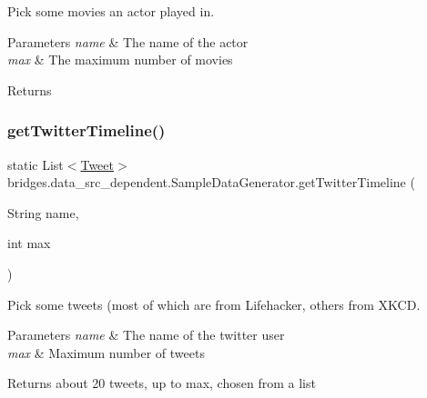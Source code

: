 Pick some movies an actor played in. 
\begin{DoxyParams}{Parameters}
{\em name} & The name of the actor \\
\hline
{\em max} & The maximum number of movies \\
\hline
\end{DoxyParams}
\begin{DoxyReturn}{Returns}

\end{DoxyReturn}
\mbox{\label{classbridges_1_1data__src__dependent_1_1_sample_data_generator_a9e52e53de820233e76553f5db1a01c80}} 
\subsubsection{\texorpdfstring{get\+Twitter\+Timeline()}{getTwitterTimeline()}}
{\footnotesize\ttfamily static List$<$\mbox{\hyperlink{classbridges_1_1data__src__dependent_1_1_tweet}{Tweet}}$>$ bridges.\+data\+\_\+src\+\_\+dependent.\+Sample\+Data\+Generator.\+get\+Twitter\+Timeline (\begin{DoxyParamCaption}\item[{String}]{name,  }\item[{int}]{max }\end{DoxyParamCaption})\hspace{0.3cm}{\ttfamily [static]}}

Pick some tweets (most of which are from Lifehacker, others from X\+K\+CD. 
\begin{DoxyParams}{Parameters}
{\em name} & The name of the twitter user \\
\hline
{\em max} & Maximum number of tweets \\
\hline
\end{DoxyParams}
\begin{DoxyReturn}{Returns}
about 20 tweets, up to max, chosen from a list 
\end{DoxyReturn}
\mbox{\label{classbridges_1_1data__src__dependent_1_1_sample_data_generator_ae37dc24f262b58481822cf228bd97054}} 
